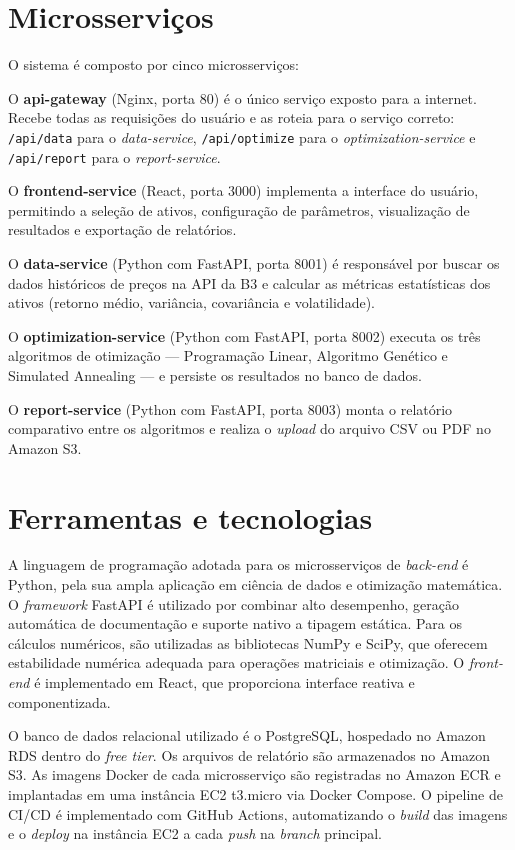 \documentclass[
	12pt,				%
	openright,			%
	oneside,			    %
	a4paper,				%
	english,			%
	french,			%
	spanish,			%
	brazil			%
	]{abntex2}
\begin{document}
\section{Microsserviços}

O sistema é composto por cinco microsserviços:

O \textbf{api-gateway} (Nginx, porta 80) é o único serviço exposto para a internet. Recebe todas as requisições do usuário e as roteia para o serviço correto: \texttt{/api/data} para o \textit{data-service}, \texttt{/api/optimize} para o \textit{optimization-service} e \texttt{/api/report} para o \textit{report-service}.

O \textbf{frontend-service} (React, porta 3000) implementa a interface do usuário, permitindo a seleção de ativos, configuração de parâmetros, visualização de resultados e exportação de relatórios.

O \textbf{data-service} (Python com FastAPI, porta 8001) é responsável por buscar os dados históricos de preços na API da B3 e calcular as métricas estatísticas dos ativos (retorno médio, variância, covariância e volatilidade).

O \textbf{optimization-service} (Python com FastAPI, porta 8002) executa os três algoritmos de otimização — Programação Linear, Algoritmo Genético e Simulated Annealing — e persiste os resultados no banco de dados.

O \textbf{report-service} (Python com FastAPI, porta 8003) monta o relatório comparativo entre os algoritmos e realiza o \textit{upload} do arquivo CSV ou PDF no Amazon S3.

\section{Ferramentas e tecnologias}

A linguagem de programação adotada para os microsserviços de \textit{back-end} é Python, pela sua ampla aplicação em ciência de dados e otimização matemática. O \textit{framework} FastAPI é utilizado por combinar alto desempenho, geração automática de documentação e suporte nativo a tipagem estática. Para os cálculos numéricos, são utilizadas as bibliotecas NumPy e SciPy, que oferecem estabilidade numérica adequada para operações matriciais e otimização. O \textit{front-end} é implementado em React, que proporciona interface reativa e componentizada.

O banco de dados relacional utilizado é o PostgreSQL, hospedado no Amazon RDS dentro do \textit{free tier}. Os arquivos de relatório são armazenados no Amazon S3. As imagens Docker de cada microsserviço são registradas no Amazon ECR e implantadas em uma instância EC2 t3.micro via Docker Compose. O pipeline de CI/CD é implementado com GitHub Actions, automatizando o \textit{build} das imagens e o \textit{deploy} na instância EC2 a cada \textit{push} na \textit{branch} principal.
\end{document}
